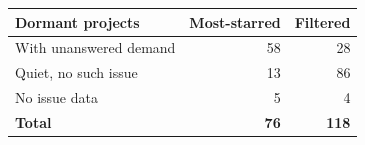 \begin{tabular}{lrr}
\toprule
Dormant projects & Most-starred & Filtered \\
\midrule
With unanswered demand & 58 & 28 \\
Quiet, no such issue & 13 & 86 \\
No issue data & 5 & 4 \\
\midrule
\textbf{Total} & \textbf{76} & \textbf{118} \\
\bottomrule
\end{tabular}
